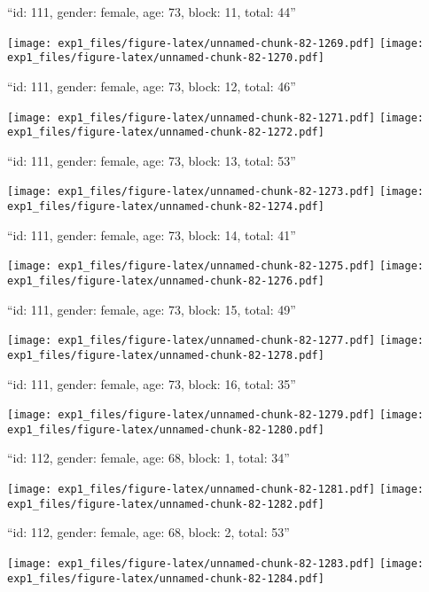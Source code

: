 \documentclass[11pt,,]{article}
\begin{document}
\newpage
[1] 

``id: 111, gender: female, age: 73, block: 11, total: 44''

\texttt{[image: exp1\_files/figure-latex/unnamed-chunk-82-1269.pdf]}
\texttt{[image: exp1\_files/figure-latex/unnamed-chunk-82-1270.pdf]}

\newpage
[1] 

``id: 111, gender: female, age: 73, block: 12, total: 46''

\texttt{[image: exp1\_files/figure-latex/unnamed-chunk-82-1271.pdf]}
\texttt{[image: exp1\_files/figure-latex/unnamed-chunk-82-1272.pdf]}

\newpage
[1] 

``id: 111, gender: female, age: 73, block: 13, total: 53''

\texttt{[image: exp1\_files/figure-latex/unnamed-chunk-82-1273.pdf]}
\texttt{[image: exp1\_files/figure-latex/unnamed-chunk-82-1274.pdf]}

\newpage
[1] 

``id: 111, gender: female, age: 73, block: 14, total: 41''

\texttt{[image: exp1\_files/figure-latex/unnamed-chunk-82-1275.pdf]}
\texttt{[image: exp1\_files/figure-latex/unnamed-chunk-82-1276.pdf]}

\newpage
[1] 

``id: 111, gender: female, age: 73, block: 15, total: 49''

\texttt{[image: exp1\_files/figure-latex/unnamed-chunk-82-1277.pdf]}
\texttt{[image: exp1\_files/figure-latex/unnamed-chunk-82-1278.pdf]}

\newpage
[1] 

``id: 111, gender: female, age: 73, block: 16, total: 35''

\texttt{[image: exp1\_files/figure-latex/unnamed-chunk-82-1279.pdf]}
\texttt{[image: exp1\_files/figure-latex/unnamed-chunk-82-1280.pdf]}

\newpage
[1] 

``id: 112, gender: female, age: 68, block: 1, total: 34''

\texttt{[image: exp1\_files/figure-latex/unnamed-chunk-82-1281.pdf]}
\texttt{[image: exp1\_files/figure-latex/unnamed-chunk-82-1282.pdf]}

\newpage
[1] 

``id: 112, gender: female, age: 68, block: 2, total: 53''

\texttt{[image: exp1\_files/figure-latex/unnamed-chunk-82-1283.pdf]}
\texttt{[image: exp1\_files/figure-latex/unnamed-chunk-82-1284.pdf]}
\end{document}
